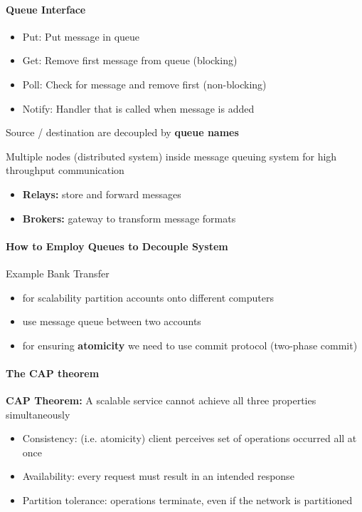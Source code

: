 \paragraph{Queue Interface}
\begin{itemize}
\item Put: Put message in queue
\item Get: Remove first message from queue (blocking)
\item Poll: Check for message and remove first (non-blocking)
\item Notify: Handler that is called when message is added
\end{itemize}

Source / destination are decoupled by \textbf{queue names}

Multiple nodes (distributed system) inside message queuing
system for high throughput communication
\begin{itemize}
\item \textbf{Relays:} store and forward messages
\item \textbf{Brokers:} gateway to transform message formats
\end{itemize}

\paragraph{How to Employ Queues to Decouple System}
Example Bank Transfer
\begin{itemize}
\item for scalability partition accounts onto different computers
\item use message queue between two accounts
\item for ensuring \textbf{atomicity} we need to use
  commit protocol (two-phase commit)
\end{itemize}


\paragraph{The CAP theorem}
\textbf{CAP Theorem:} A scalable service cannot achieve all three
properties simultaneously
\begin{itemize}
\item Consistency: (i.e. atomicity) client perceives set of
  operations occurred all at once
\item Availability: every request must result in an intended
  response
\item Partition tolerance: operations terminate,
  even if the network is partitioned
\end{itemize}

